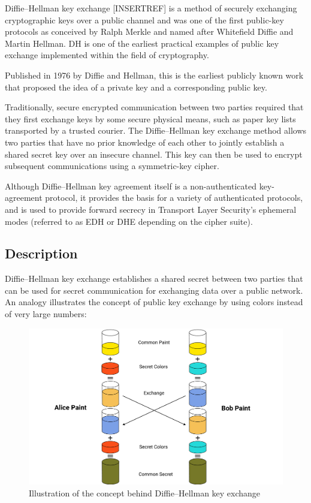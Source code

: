 Diffie–Hellman key exchange [INSERTREF] is a method of securely exchanging cryptographic keys over a public channel
and was one of the first public-key protocols
as conceived by Ralph Merkle and named after Whitefield Diffie and Martin Hellman.
DH is one of the earliest practical examples of public key exchange implemented within the field of cryptography.

Published in 1976 by Diffie and Hellman, this is the earliest publicly known work that proposed the idea of a private
key and a corresponding public key.

Traditionally, secure encrypted communication between two parties required that they first exchange keys by some secure physical means,
such as paper key lists transported by a trusted courier.
The Diffie–Hellman key exchange method allows two parties that have no prior knowledge of
each other to jointly establish a shared secret key over an insecure channel.
This key can then be used to encrypt subsequent communications using a symmetric-key cipher.

Although Diffie–Hellman key agreement itself is a non-authenticated key-agreement protocol, it provides the basis for a
variety of authenticated protocols,
and is used to provide forward secrecy in Transport Layer Security's ephemeral modes
(referred to as EDH or DHE depending on the cipher suite).

\subsection{Description}\label{subsec:description}

Diffie–Hellman key exchange establishes a shared secret between two parties that can be used for secret communication
for exchanging data over a public network.
An analogy illustrates the concept of public key exchange by using colors instead of very large numbers:

\begin{figure}[H]
    \centering
    \includegraphics[width=1\textwidth]{Pictures/Diffie-Hellman.pdf}
    \caption{Illustration of the concept behind Diffie–Hellman key exchange}\label{fig:figure4}
\end{figure}

